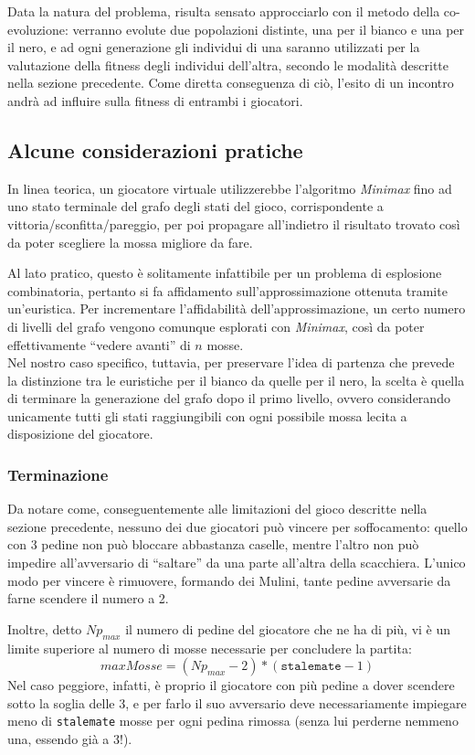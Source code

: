 \documentclass{../llncs}
\begin{document}
Data la natura del problema, risulta sensato approcciarlo con il metodo della co-evoluzione: verranno evolute due popolazioni distinte, una per il bianco e una per il nero, e ad ogni generazione gli individui di una saranno utilizzati per la valutazione della fitness degli individui dell'altra, secondo le modalità descritte nella sezione precedente. Come diretta conseguenza di ciò, l'esito di un incontro andrà ad influire sulla fitness di entrambi i giocatori.

\subsection{Alcune considerazioni pratiche}
In linea teorica, un giocatore virtuale utilizzerebbe l'algoritmo \emph{Minimax} fino ad uno stato terminale del grafo degli stati del gioco, corrispondente a vittoria/sconfitta/pareggio, per poi propagare all'indietro il risultato trovato così da poter scegliere la mossa migliore da fare.

Al lato pratico, questo è solitamente infattibile per un problema di esplosione combinatoria, pertanto si fa affidamento sull'approssimazione ottenuta tramite un'euristica. Per incrementare l'affidabilità dell'approssimazione, un certo numero di livelli del grafo vengono comunque esplorati con \emph{Minimax}, così da poter effettivamente ``vedere avanti'' di $n$ mosse.\\

Nel nostro caso specifico, tuttavia, per preservare l'idea di partenza che prevede la distinzione tra le euristiche per il bianco da quelle per il nero, la scelta è quella di terminare la generazione del grafo dopo il primo livello, ovvero considerando unicamente tutti gli stati raggiungibili con ogni possibile mossa lecita a disposizione del giocatore.\\

\subsubsection{Terminazione}
Da notare come, conseguentemente alle limitazioni del gioco descritte nella sezione precedente, nessuno dei due giocatori può vincere per soffocamento: quello con 3 pedine non può bloccare abbastanza caselle, mentre l'altro non può impedire all'avversario di ``saltare'' da una parte all'altra della scacchiera. L'unico modo per vincere è rimuovere, formando dei Mulini, tante pedine avversarie da farne scendere il numero a 2.

Inoltre, detto $Np_{max}$ il numero di pedine del giocatore che ne ha di più, vi è un limite superiore al numero di mosse necessarie per concludere la partita:
\[
maxMosse = (Np_{max}-2) * (\texttt{stalemate}-1)
\]
Nel caso peggiore, infatti, è proprio il giocatore con più pedine a dover scendere sotto la soglia delle 3, e per farlo il suo avversario deve necessariamente impiegare meno di \texttt{stalemate} mosse per ogni pedina rimossa (senza lui perderne nemmeno una, essendo già a 3!).
\end{document}
